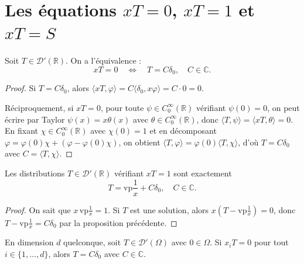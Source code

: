 \documentclass[12pt,a4paper,openany]{book}
\theoremstyle{definition}
\theoremstyle{plain}
\theoremstyle{remark}
\begin{document}
	\section{Les équations \texorpdfstring{$xT=0$}{xT=0}, \texorpdfstring{$xT=1$}{xT=1} et \texorpdfstring{$xT=S$}{xT=S}}
	
	\begin{proposition}
		Soit $T \in \mathcal{D}'(\mathbb{R})$. On a l'équivalence :
		\[
		xT = 0 \quad \Longleftrightarrow \quad T = C\delta_0, \quad C \in \mathbb{C}.
		\]
	\end{proposition}
	
	\begin{proof}
		Si $T = C\delta_0$, alors $\langle xT, \varphi \rangle = C\langle \delta_0, x\varphi \rangle = C \cdot 0 = 0$.
		
		Réciproquement, si $xT = 0$, pour toute $\psi \in C_0^\infty(\mathbb{R})$ vérifiant $\psi(0) = 0$, on peut écrire par Taylor $\psi(x) = x\theta(x)$ avec $\theta \in C_0^\infty(\mathbb{R})$, donc $\langle T, \psi \rangle = \langle xT, \theta \rangle = 0$. En fixant $\chi \in C_0^\infty(\mathbb{R})$ avec $\chi(0)=1$ et en décomposant $\varphi = \varphi(0)\chi + (\varphi - \varphi(0)\chi)$, on obtient $\langle T, \varphi \rangle = \varphi(0)\langle T, \chi \rangle$, d'où $T = C\delta_0$ avec $C = \langle T, \chi \rangle$.
	\end{proof}
	
	\begin{proposition}
		Les distributions $T \in \mathcal{D}'(\mathbb{R})$ vérifiant $xT = 1$ sont exactement
		\[
		T = \mathrm{vp}\frac{1}{x} + C\delta_0, \quad C \in \mathbb{C}.
		\]
	\end{proposition}
	
	\begin{proof}
		On sait que $x\,\mathrm{vp}\frac{1}{x} = 1$. Si $T$ est une solution, alors $x(T - \mathrm{vp}\frac{1}{x}) = 0$, donc $T - \mathrm{vp}\frac{1}{x} = C\delta_0$ par la proposition précédente.
	\end{proof}
	
	\begin{proposition}
		En dimension $d$ quelconque, soit $T \in \mathcal{D}'(\Omega)$ avec $0 \in \Omega$. Si $x_i T = 0$ pour tout $i \in \{1, \ldots, d\}$, alors $T = C\delta_0$ avec $C \in \mathbb{C}$.
	\end{proposition}
	
\end{document}
